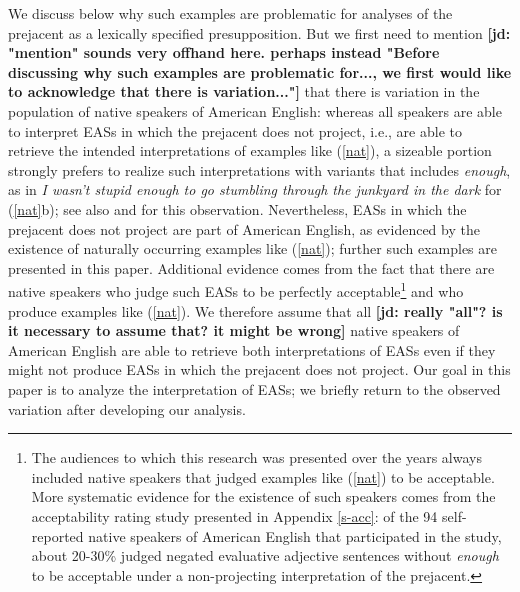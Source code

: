 \documentclass[11pt,fleqn]{article}
\newcommand{\6}{\mbox{$[\hspace*{-.6mm}[$}}
\newcommand{\9}{\mbox{$]\hspace*{-.6mm}]$}}
\newcommand{\jd}[1]{\textbf{\color{red}[jd: #1]}}
\begin{document}
We discuss below why such examples are problematic for analyses of the prejacent as a lexically specified presupposition. But we first need to mention \jd{"mention" sounds very offhand here. perhaps instead "Before discussing why such examples are problematic for..., we first would like to acknowledge that there is variation..."} that there is variation in the population of native speakers of American English: whereas all speakers are able to interpret EASs in which the prejacent does not project, i.e., are able to retrieve the intended interpretations of examples like (\ref{nat}), a sizeable portion strongly prefers to realize such interpretations with variants that includes {\em enough}, as in {\em I wasn't stupid enough to go stumbling through the junkyard in the dark} for (\ref{nat}b); see also \citealt{karttunen2013} and \citealt{karttunen-etal2014} for this observation. Nevertheless, EASs in which the prejacent does not project are part of American English, as evidenced by the existence of naturally occurring examples like (\ref{nat}); further  such examples are presented in this paper. Additional evidence comes from the fact that there are native speakers who judge such EASs to be perfectly acceptable\footnote{The audiences to which this research was presented over the years always included native speakers that judged examples like (\ref{nat}) to be acceptable. More systematic evidence for the existence of such speakers comes from the acceptability rating study presented in Appendix \ref{s-acc}: of the 94 self-reported native speakers of American English that participated in the study, about 20-30\% judged negated evaluative adjective sentences without {\em enough} to be acceptable under a non-projecting interpretation of the prejacent.} and who produce examples like (\ref{nat}). We therefore assume that all \jd{really "all"? is it necessary to assume that? it might be wrong} native speakers of American English are able to retrieve both interpretations of EASs even if they might not produce EASs in which the prejacent does not project. Our goal in this paper is to analyze the interpretation of EASs; we briefly return to the observed variation after developing our analysis.
\end{document}
